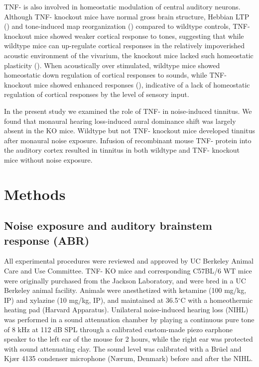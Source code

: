 TNF-\textalpha{} is also involved in homeostatic modulation of central auditory neurons. Although TNF-\textalpha{} knockout mice have normal gross brain structure, Hebbian LTP (\cite{Kaneko2008}) and tone-induced map reorganization (\cite{Yang2013}) compared to wildtype controls, TNF-\textalpha{} knockout mice showed weaker cortical response to tones, suggesting that while wildtype mice can up-regulate cortical responses in the relatively impoverished acoustic environment of the vivarium, the knockout mice lacked such homeostatic plasticity (\cite{Yang2013}). When acoustically over stimulated, wildtype mice showed homeostatic down regulation of cortical responses to sounds, while TNF-\textalpha{} knockout mice showed enhanced responses (\cite{Yang2013}), indicative of a lack of homeostatic regulation of cortical responses by the level of sensory input.

In the present study we examined the role of TNF-\textalpha{} in noise-induced tinnitus. We found that monaural hearing loss-induced aural dominance shift was largely absent in the KO mice. Wildtype but not TNF-\textalpha{} knockout mice developed tinnitus after monaural noise exposure. Infusion of recombinant mouse TNF-\textalpha{} protein into the auditory cortex resulted in tinnitus in both wildtype and TNF-\textalpha{} knockout mice without noise exposure.

\section{Methods}

\subsection{Noise exposure and auditory brainstem response (ABR)}
All experimental procedures were reviewed and approved by UC Berkeley Animal Care and Use Committee. TNF-\textalpha{} KO mice and corresponding C57BL/6 WT mice were originally purchased from the Jackson Laboratory, and were bred in a UC Berkeley animal facility. Animals were anesthetized with ketamine (100 mg/kg, IP) and xylazine (10 mg/kg, IP), and maintained at 36.5$^\circ$C with a homeothermic heating pad (Harvard Apparatus). Unilateral noise-induced hearing loss (NIHL) was performed in a sound attenuation chamber by playing a continuous pure tone of 8 kHz at 112 dB SPL through a calibrated custom-made piezo earphone speaker to the left ear of the mouse for 2 hours, while the right ear was protected with sound attenuating clay. The sound level was calibrated with a Br\"uel and Kj\ae r 4135 condenser microphone (N\ae rum, Denmark) before and after the NIHL.

